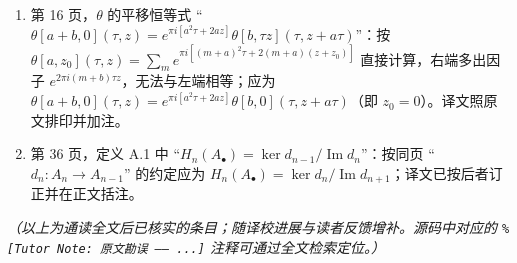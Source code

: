 \documentclass[11pt,a4paper]{article}
\theoremstyle{plain}
\theoremstyle{definition}
\begin{document}
\begin{enumerate}[label=(\arabic*),leftmargin=2.2em]
  \item 第 16 页，$\theta$ 的平移恒等式 “$\theta[a+b,0](\tau,z)=e^{\pi i[a^2\tau+2az]}\theta[b,\tau z](\tau,z+a\tau)$”：按 $\theta[a,z_0](\tau,z)=\sum_m e^{\pi i[(m+a)^2\tau+2(m+a)(z+z_0)]}$ 直接计算，右端多出因子 $e^{2\pi i(m+b)\tau z}$，无法与左端相等；应为 $\theta[a+b,0](\tau,z)=e^{\pi i[a^2\tau+2az]}\theta[b,0](\tau,z+a\tau)$（即 $z_0=0$）。译文照原文排印并加注。
  \item 第 36 页，定义 A.1 中 “$H_n(A_\bullet)=\ker d_{n-1}/\operatorname{Im}d_n$”：按同页 “$d_n:A_n\to A_{n-1}$” 的约定应为 $H_n(A_\bullet)=\ker d_n/\operatorname{Im}d_{n+1}$；译文已按后者订正并在正文括注。
\end{enumerate}

\noindent\textit{（以上为通读全文后已核实的条目；随译校进展与读者反馈增补。源码中对应的 \texttt{\% [Tutor Note: 原文勘误 —— ...]} 注释可通过全文检索定位。）}
\end{document}
